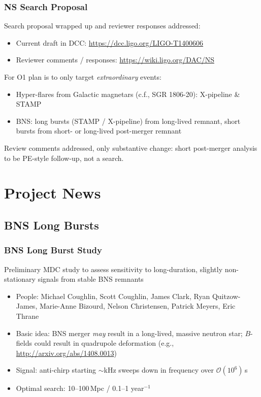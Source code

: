 \documentclass{beamer}
\begin{document}
\begin{frame}
    \frametitle{NS Search Proposal}
    Search proposal wrapped up and reviewer responses addressed:
    \begin{itemize}
        \item Current draft in DCC: {\small \href{https://dcc.ligo.org/LIGO-T1400606}{https://dcc.ligo.org/LIGO-T1400606}}
        \item Reviewer comments / responses: \url{https://wiki.ligo.org/DAC/NS}
    \end{itemize}
    For O1 plan is to only target \emph{extraordinary} events:
    \begin{itemize}
        \item Hyper-flares from Galactic magnetars (c.f., SGR 1806-20):
            X-pipeline \& STAMP
        \item BNS: long bursts (STAMP / X-pipeline) from long-lived remnant,
            short bursts from short- or long-lived post-merger remnant
    \end{itemize}
    Review comments addressed, only substantive change: short post-merger
    analysis to be PE-style follow-up, not a search.
\end{frame}

\section{Project News}

\subsection{BNS Long Bursts}
\begin{frame}
    \frametitle{BNS Long Burst Study}
    Preliminary MDC study to assess sensitivity to long-duration, slightly
    non-stationary signals from stable BNS remnants
    \begin{itemize}
        \item People: Michael Coughlin, Scott Coughlin, James Clark, Ryan
            Quitzow-James, Marie-Anne Bizourd, Nelson Christensen, Patrick
            Meyers, Eric Thrane
        \item Basic idea: BNS merger \emph{may} result in a long-lived, massive
            neutron star; $B$-fields could result in quadrupole deformation
            (e.g., \url{http://arxiv.org/abs/1408.0013})
        \item Signal: anti-chirp starting $\sim$kHz sweeps down in frequency
            over $\mathcal{O}(10^6)$\,s
        \item Optimal search: 10--100\,Mpc / 0.1--1 year$^{-1}$
    \end{itemize}
\end{frame}
\end{document}
